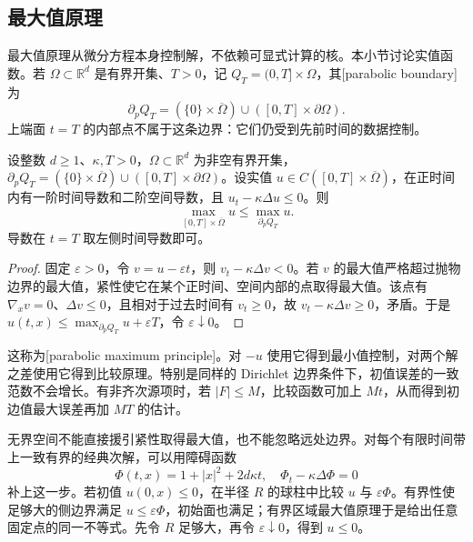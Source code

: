 \subsection{最大值原理}
\label{b2:subsec:120302}

最大值原理从微分方程本身控制解，不依赖可显式计算的核。本小节讨论实值函数。若 \(\Omega\subset\mathbb R^d\) 是有界开集、\(T>0\)，记 \(Q_T=(0,T]\times\Omega\)，其[parabolic boundary]为
\[
 \partial_pQ_T=(\{0\}\times\overline\Omega)
 \cup([0,T]\times\partial\Omega).
\]
上端面 \(t=T\) 的内部点不属于这条边界：它们仍受到先前时间的数据控制。

\begin{theorem}[抛物最大值原理]\label{b2:thm:12-maximum}
设整数 \(d\geq1\)、\(\kappa,T>0\)，\(\Omega\subset\mathbb R^d\) 为非空有界开集，\(\partial_pQ_T=(\{0\}\times\overline\Omega)\cup([0,T]\times\partial\Omega)\)。设实值 \(u\in C([0,T]\times\overline\Omega)\)，在正时间内有一阶时间导数和二阶空间导数，且 \(u_t-\kappa\Delta u\leq0\)。则
\[
 \max_{[0,T]\times\overline\Omega}u
 \leq\max_{\partial_pQ_T}u.
\]
导数在 \(t=T\) 取左侧时间导数即可。
\end{theorem}
\begin{proof}
固定 \(\varepsilon>0\)，令 \(v=u-\varepsilon t\)，则 \(v_t-\kappa\Delta v<0\)。若 \(v\) 的最大值严格超过抛物边界的最大值，紧性使它在某个正时间、空间内部的点取得最大值。该点有 \(\nabla_xv=0\)、\(\Delta v\leq0\)，且相对于过去时间有 \(v_t\geq0\)，故 \(v_t-\kappa\Delta v\geq0\)，矛盾。于是 \(u(t,x)\leq\max_{\partial_pQ_T}u+\varepsilon T\)，令 \(\varepsilon\downarrow0\)。
\end{proof}

这称为[parabolic maximum principle]。对 \(-u\) 使用它得到最小值控制，对两个解之差使用它得到比较原理。特别是同样的 Dirichlet 边界条件下，初值误差的一致范数不会增长。有非齐次源项时，若 \(|F|\leq M\)，比较函数可加上 \(Mt\)，从而得到初边值最大误差再加 \(MT\) 的估计。

\ProseParagraphBreak

无界空间不能直接援引紧性取得最大值，也不能忽略远处边界。对每个有限时间带上一致有界的经典次解，可以用障碍函数
\[
 \Phi(t,x)=1+|x|^2+2d\kappa t,
 \quad\Phi_t-\kappa\Delta\Phi=0
\]
补上这一步。若初值 \(u(0,x)\leq0\)，在半径 \(R\) 的球柱中比较 \(u\) 与 \(\varepsilon\Phi\)。有界性使足够大的侧边界满足 \(u\leq\varepsilon\Phi\)，初始面也满足；有界区域最大值原理于是给出任意固定点的同一不等式。先令 \(R\) 足够大，再令 \(\varepsilon\downarrow0\)，得到 \(u\leq0\)。

